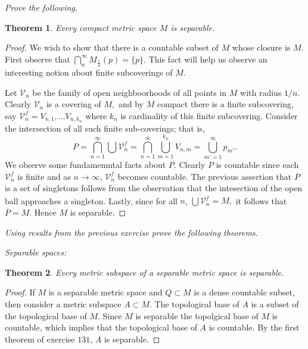 \documentclass[letter]{article}
\newtheorem{theorem}{Theorem}
\newenvironment{menumerate}{%
  \edef\backupindent{\the\parindent}%
  \enumerate%
  \setlength{\parindent}{\backupindent}%
}{\endenumerate}
\begin{document}
\begin{menumerate}
\begin{menumerate}
			\item \emph{Prove the following.}
			\begin{theorem}
				Every compact metric space $M$ is separable.
			\end{theorem}
			\begin{proof}
				We wish to show that there is a countable subset of $M$ whose closure is $M$. First observe that $\bigcap_n^\infty M_{\frac{1}{n}}(p) = \{p\}. $ This fact will help us observe an interesting notion about finite subcoverings of $M$.
				
				Let $\mathcal{V}_n$ be the family of open neighboorhoods of all points in $M$ with radius $1/n.$ Clearly $\mathcal{V}_n$ is a covering of $M,$ and by $M$ compact there is a finite subcovering, say $\mathcal{V}_n^f = V_{n,1},\dots V_{n,k_n}$ where $k_n$ is cardinality of this finite subcovering. Consider the intersection of all such finite sub-coverings; that is, $$P =\bigcap_{n=1}^\infty \bigcup \mathcal{V}_n^f = \bigcap_{n=1}^\infty \bigcup_{m=1}^{k_n} V_{n,m} = \bigcup_{m'=1}^{\infty} {p_{m'}}.$$
				We observe some fundamenmtal facts about $P.$ Clearly $P$ is countable since each $\mathcal{V}_n^f$ is finite and as $n\to \infty$, $\mathcal{V}_n^f$ becomes countable. The previous assertion that $P$ is a set of singletons follows from the observation that the intesection of the open ball approaches a singleton. Lastly, since for all $n$, $\overline{\bigcup \mathcal{V}_n^f} = M,$ it follows that $\overline{P} = M.$ 
				Hence $M$ is separable.
			\end{proof}
		\end{menumerate}
	\item \emph{Using results from the previous exercise prove the following theorems.}
		\begin{menumerate}
			\item \emph{Separable spaces:}
			\begin{theorem}
				Every metric subspace of a separable metric space is separable.
			\end{theorem}
			\begin{proof}
				If $M$ is a separable metric space and $Q \subset M$ is a dense countable subset, then consider a metric subspace $A \subset M$. The topological base of $A$ is a subset of the topological base of $M.$ Since $M$ is separable the topolgical base of $M$ is countable, which implies that the topological base of $A$ is countable. By the first theorem of exercise $131$, $A$ is separable.

\end{proof}
\end{menumerate}
\end{menumerate}
\end{document}
